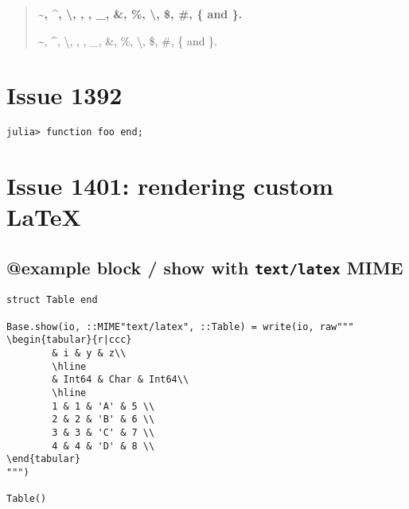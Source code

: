 \begin{quote}
\textbf{{\textasciitilde}, {\textasciicircum}, {\textbackslash}, {\textquotesingle}, {\textquotedbl}, \_, \&, \%, {\textbackslash}, \$, \#, \{ and \}.}

{\textasciitilde}, {\textasciicircum}, {\textbackslash}, {\textquotesingle}, {\textquotedbl}, \_, \&, \%, {\textbackslash}, \$, \#, \{ and \}.

\end{quote}


\section{Issue 1392}



\label{987107409634109244}{}



\begin{verbatim}
julia> function foo end;
\end{verbatim}



\section{Issue 1401: rendering custom LaTeX}



\label{1766923436598802013}{}


\subsection{@example block / show with \texttt{text/latex} MIME}



\label{12212591717920375664}{}



\begin{verbatim}
struct Table end

Base.show(io, ::MIME"text/latex", ::Table) = write(io, raw"""
\begin{tabular}{r|ccc}
        & i & y & z\\
        \hline
        & Int64 & Char & Int64\\
        \hline
        1 & 1 & 'A' & 5 \\
        2 & 2 & 'B' & 6 \\
        3 & 3 & 'C' & 7 \\
        4 & 4 & 'D' & 8 \\
\end{tabular}
""")

Table()
\end{verbatim}

